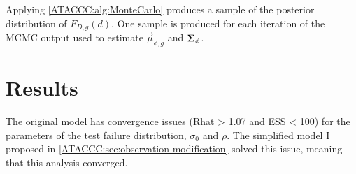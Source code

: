 \documentclass[thesis.tex]{subfiles}
\begin{document}
\begin{algorithm}
  \caption{%
  Algorithm to calculate the Monte Carlo integral in \cref{ATACCC:eq:FDintegral}, producing the posterior distribution of $F_{D,g}(d)$.
  The posterior distribution is represented as a sample $F_{D,g}^{(1)}, \dots, F_{D,g}^{(N)}$.
  $\vec{\mu}_{\phi,g}^{(i)}$ and $\matr{\Sigma}_\phi^{(i)}$ denote the $i$th posterior sample of $\vec{\mu}_{\phi,g}$ and $\matr{\Sigma}_\phi$ respectively, taken from the MCMC output which produced $N$ posterior samples.
  $M$ is the number of individuals to draw, I found $M =\numprint{100000}$ produced stable estimates of the tail of $F_{D,g}(d)$ if $\dmax = 45$.
 }
 \label{ATACCC:alg:MonteCarlo}
\end{algorithm}

Applying \cref{ATACCC:alg:MonteCarlo} produces a sample of the posterior distribution of $F_{D,g}(d)$.
One sample is produced for each iteration of the MCMC output used to estimate $\vec{\mu}_{\phi,g}$ and $\matr{\Sigma}_\phi$.

\section{Results} \label{ATACCC:sec:results}


The original \textcite{hakkiOnset} model has convergence issues (Rhat > 1.07 and ESS < 100) for the parameters of the test failure distribution, $\sigma_0$ and $\rho$.
The simplified model I proposed in \cref{ATACCC:sec:observation-modification} solved this issue, meaning that this analysis converged.
\end{document}

